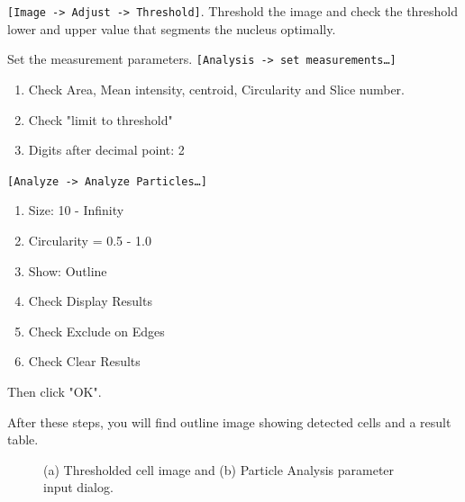 \documentclass[11pt,a4paper,oneside]{report}
\newcommand{\ijmenu}[1]{\texttt{\small#1}}
\begin{document}
\begin{enumerate}
\small{
\item \ijmenu{[Image -> Adjust -> Threshold]}. Threshold the image and check the threshold lower and upper value that segments the nucleus optimally. 
\item Set the measurement parameters. \ijmenu{[Analysis -> set measurements\ldots]}
\begin{enumerate}
\item Check Area, Mean intensity, centroid, Circularity and Slice number. 
\item Check "limit to threshold"
\item Digits after decimal point: 2
\end{enumerate}
\item \ijmenu{[Analyze -> Analyze Particles\ldots]}
\begin{enumerate}
\item Size: 10 - Infinity
\item Circularity = 0.5 - 1.0
\item Show: Outline
\item Check Display Results
\item Check Exclude on Edges
\item Check Clear Results
\end{enumerate}
\item Then click "OK". 
}
\end{enumerate}
After these steps, you will find outline image showing detected cells and a result table. 

\begin{figure}[htbp]
 \centering
 \caption{ (a) Thresholded cell image and (b) Particle Analysis parameter input dialog.}
 \label{fig:ParticleAnalysis}
\end{figure}
\end{document}
